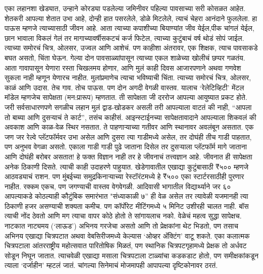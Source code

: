 एका लहानशा खेड्यात, उन्हाने कोरड्या पडलेल्या जमिनीवर पहिल्या पावसाच्या सरी कोसळत आहेत. शेतकरी आपल्या शेतात उभा आहे, दोन्ही हात पसरलेले, डोळे मिटलेले, त्याचं चेहरा आनंदाने फुललेला. हा पाऊस म्हणजे त्याच्यासाठी जीवन आहे. आता त्याच्या कपाशीच्या बियाण्यांत जीव येईल,पीक चांगलं येईल, छान भावाला विकलं गेलं तर मागाच्यावर्षीसकटचं कर्ज फिटेल, त्याच्या कुटुंबाचं वर्ष थोडं सोपं जाईल. त्याच्या समोरचं चित्र, ओलसर, उज्वल आणि आशेचं. पण काहीशा अंतरावर, एक शिक्षक, त्याच पावसाकडे बघत असतो, चिंता घेऊन. गेल्या दोन पावसाळ्यांपासून त्याच्या एकल शाळेच्या खोलीचं छप्पर गळतंय. आता गावापासून येणारा रस्ता चिखलमय होणार, आणि मुलं काही दिवस आजारपणाने अथवा गणवेश सुकला नाही म्हणून येणारच नाहीत. मुलांप्रमाणेच त्याचा भविष्याची चिंता. त्याच्या समोरचं चित्र, ओलसर, काळं आणि उदास. तेच गाव. तोच पाऊस. पण दोन अगदी वेगळी वास्तव. यालाच ‘रेलेटिव्हिटी’ मेंटल मॉडेल म्हणजेच सापेक्षता (मन:प्रारूप) म्हणतात. ती सापेक्षता जी दररोज आपल्या आयुष्यात प्रकट होते. जरी सर्वसाधारणपणे सगळीच लहान मुलं द्वाड-खोडकर असली तरी आपल्याला वाटतं की नाही, “आपला तो बाब्या आणि दुसर्‍याचं ते कार्ट”, तसंच काहीसं. 
आइन्स्टाईनच्या सापेक्षतावादाने आपल्याला शिकवलं की अवकाश आणि काळ-वेळ स्थिर नसतात. ते पाहणाऱ्याच्या गतीवर आणि स्थानावर अवलंबून असतात. एक जण जर रेल्वे प्लॅटफॉर्मवर उभा असेल आणि दुसरा त्या गाडीमध्ये असेल, तर दोघंही तीच गाडी पाहतात, पण अनुभव वेगळा असतो. एकाला गाडी गाडी पुढे जाताना दिसेल तर दुसऱ्याला प्लॅटफॉर्म मागे जाताना आणि दोघंही बरोबर असतात! हे फक्त विज्ञान नाही तर हे जीवनाचं तत्त्वज्ञान आहे. जीवनात ही सापेक्षता अनेक ठिकाणी दिसते. त्याची काही उदाहरणे पाहुयात. 
खेडेगावातील एखाद्या कुटुंबासाठी ₹५०० म्हणजे आठवड्याचं राशन. पण मुंबईच्या समुद्रकिनाऱ्याच्या रेस्टॉरंटमध्ये हे ₹५०० एका स्टार्टरसाठीही पुरणार नाहीत. रक्कम एकच, पण जगण्याची वास्तव वेगवेगळी.
आदिवासी भागातील विद्यार्थ्याने जर ६०%
आपल्याकडे कोठल्याही कौटुंबिक समारंभात "संध्याकाळी ७” ही वेळ असेल तर त्यावेळी यजमानही त्या ठिकाणी हजर असण्याची शक्यता कमीच. पण कॉर्पोरेट मीटिंगमध्ये ५ मिनिट उशीरही चालत नाही. बॉस त्याची नोंद ठेवतो आणि मग त्याचा वापर कोठे होतो ते सांगायलाच नको. वेळेचं महत्व सुद्धा सापेक्षच.
नाटकात नाट्यमय (‘लाऊड’) अभिनय गरजेचा असतो आणि तो प्रेक्षकांना थेट भिडतो, पण तसाच अभिनय एखाद्या चित्रपटात अथवा वेबसिरीजमध्ये केल्यास ‘ओव्हर अ‍ॅक्टिंग’ वाटू शकते. 
एका कलात्मक चित्रपटाला आंतरराष्ट्रीय महोत्सवात पारितोषिक मिळतं, पण स्थानिक चित्रपटगृहामध्ये प्रेक्षक तो अर्धवट सोडून निघून जातात. त्याचवेळी एखाद्या मसाला चित्रपटाला टाळ्यांचा कडकडाट होतो, पण समीक्षकांकडून त्याला ‘दर्जाहीन’ म्हटलं जातं. चांगल्या सिनेमाचं मोजमापही आपापल्या दृष्टिकोनावर ठरतं.
